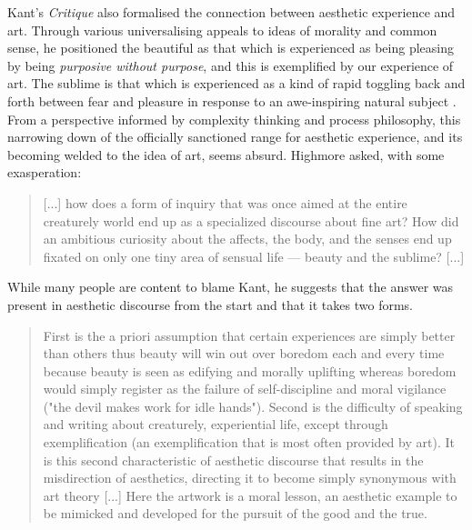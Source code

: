         Kant's \emph{Critique} also formalised the connection between aesthetic experience and art. Through various universalising appeals to ideas of morality and common sense, he positioned the beautiful as that which is experienced as being pleasing by being \emph{purposive without purpose}, and this is exemplified by our experience of art. The sublime is 
        that which is experienced as a kind of rapid toggling back and forth between fear and pleasure in response to an awe-inspiring natural subject . From a perspective informed by complexity thinking and process philosophy, this narrowing down of the officially sanctioned range for aesthetic experience, and its becoming welded to the idea of art, seems absurd. Highmore asked, with some exasperation:

        \begin{quote}
            [...] how does a form of inquiry that was once aimed at the entire creaturely world end up as a specialized discourse about fine art? How did an ambitious curiosity about the affects, the body, and the senses end up fixated on only one tiny area of sensual life — beauty and the sublime? [...] \citep[p.121-122]{HighmoreBttrAftrTst2010}
        \end{quote}

        While many people are content to blame Kant, he suggests that the answer was present in aesthetic discourse from the start and that it takes two forms. 

        \begin{quote}
            First is the a priori assumption that certain experiences are simply better than others thus beauty will win out over boredom each and every time because beauty is seen as edifying and morally uplifting whereas boredom would simply register as the failure of self-discipline and moral vigilance ("the devil makes work for idle hands"). Second is the difficulty of speaking and writing about creaturely, experiential life, except through exemplification (an exemplification that is most often provided by art). It is this second characteristic of aesthetic discourse that results in the misdirection of aesthetics, directing it to become simply synonymous with art theory [...] Here the artwork is a moral lesson, an aesthetic example to be mimicked and developed for the pursuit of the good and the true.\citep[p.122]{HighmoreBttrAftrTst2010}
        \end{quote}

